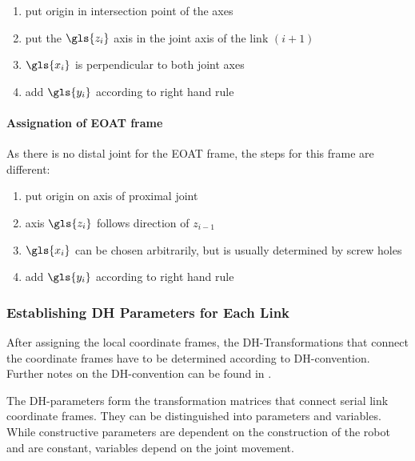 \begin{itemize}[wide=\parindent]
	\begin{enumerate}[label=\emph{\alph*)}]
		\item put origin in intersection point of the axes
		\item put the $\gls{z_i}$ axis in the joint axis of the link $(i+1)$
		\item $\gls{x_i}$ is perpendicular to both joint axes
		\item add $\gls{y_i}$ according to right hand rule
	\end{enumerate}
\end{itemize}





\paragraph{Assignation of \ac{EOAT} frame}
As there is no distal joint for the \ac{EOAT} frame, the steps for this frame are different:

\begin{enumerate}[label=\emph{\alph*)}]
	\item put origin on axis of proximal joint 
	\item axis $\gls{z_i}$ follows direction of $z_{i-1}$
	\item $\gls{x_i}$ can be chosen arbitrarily, but is usually determined by screw holes
	\item add $\gls{y_i}$ according to right hand rule
\end{enumerate}


\subsubsection{Establishing \ac{DH} Parameters for Each Link} \label{sec:DHparPerLink}

After assigning the local coordinate frames, the \ac{DH}-Transformations that connect the coordinate frames have to be determined according to \ac{DH}-convention.
Further notes on the \ac{DH}-convention can be found in  .




The \ac{DH}-parameters form the transformation matrices that connect serial link coordinate frames. They can be distinguished into parameters and variables. While constructive parameters are dependent on the construction of the robot and are constant, variables depend on the joint movement. \cite{FwdInvAnalysRobManip} \cite{ConstantinForwardKA} \cite{DenavitHartenbergKonventionen}

